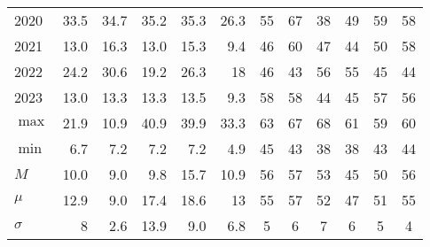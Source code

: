 \documentclass{article}
\begin{document}
\begin{table}[!ht]
\begin{tabular}{l || rrr || rr || cc||cc||cc}
        2020 & \cellcolor{green!25}33.5 & 34.7 & \cellcolor{red!25}35.2 & \cellcolor{red!25}35.3 & 26.3 & 55 & \cellcolor{green!25}67 & 38 & \cellcolor{green!25}49 & \cellcolor{green!25}59 & 58 \\ 
        2021 & \cellcolor{green!25}13.0 & \cellcolor{red!25}16.3 & \cellcolor{green!25}13.0 & \cellcolor{red!25}15.3 & 9.4 & 46 & \cellcolor{green!25}60 & \cellcolor{green!25}47 & 44 & 50 & \cellcolor{green!25}58 \\ 
        2022 & 24.2 & \cellcolor{red!25}30.6 & \cellcolor{green!25}19.2 & \cellcolor{red!25}26.3 & 18 & \cellcolor{green!25}46 & 43 & \cellcolor{green!25}56 & 55 & \cellcolor{green!25}45 & 44 \\ 
        2023 & \cellcolor{green!25}13.0 & \cellcolor{red!25}13.3 & \cellcolor{red!25}13.3 & \cellcolor{red!25}13.5 & 9.3 & \cellcolor{green!25}58 & 58 & 44 & \cellcolor{green!25}45 & \cellcolor{green!25}57 & 56 \\ \hline
        $\max$ & 21.9 & \cellcolor{green!25}10.9 & \cellcolor{red!25}40.9 & \cellcolor{red!25}39.9 & 33.3 & 63 & \cellcolor{green!25}67 & \cellcolor{green!25}68 & 61 & 59 & \cellcolor{green!25}60 \\ 
        $\min$ & \cellcolor{green!25}6.7 & \cellcolor{red!25}7.2 & \cellcolor{red!25}7.2 & \cellcolor{red!25}7.2 & 4.9 & \cellcolor{green!25}45 & 43 & \cellcolor{green!25}38 & \cellcolor{green!25}38 & 43 & \cellcolor{green!25}44 \\ 
        $M$ & \cellcolor{red!25}10.0 & \cellcolor{green!25}9.0 & 9.8 & \cellcolor{red!25}15.7 & 10.9 & 56 & \cellcolor{green!25}57 & \cellcolor{green!25}53 & 45 & 50 & \cellcolor{green!25}56 \\ 
        $\mu$  & 12.9 & \cellcolor{green!25}9.0 & \cellcolor{red!25}17.4 & \cellcolor{red!25}18.6 & 13 & 55 & \cellcolor{green!25}57 & \cellcolor{green!25}52 & 47 & 51 & \cellcolor{green!25}55 \\ 
        $\sigma$ & 8 & \cellcolor{green!25}2.6 & \cellcolor{red!25}13.9 & \cellcolor{red!25}9.0 & 6.8 & 5 & \cellcolor{green!25}6 & \cellcolor{green!25}7 & 6 & \cellcolor{green!25}5 & 4 \\ \hline
    \end{tabular}
    \label{tab:comparison_volatility_ml_metrics}
\end{table}
\end{document}
